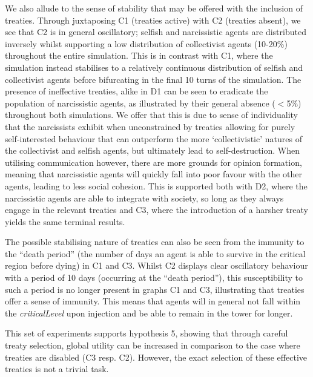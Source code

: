 We also allude to the sense of stability that may be offered with the inclusion of treaties. Through juxtaposing C1 (treaties active) with C2 (treaties absent), we see that C2 is in general oscillatory; selfish and narcissistic agents are distributed inversely whilst supporting a low distribution of collectivist agents (10-20\%) throughout the entire simulation. This is in contrast with C1, where the simulation instead stabilises to a relatively continuous distribution of selfish and collectivist agents before bifurcating in the final 10 turns of the simulation. The presence of ineffective treaties, alike in D1 can be seen to eradicate the population of narcissistic agents, as illustrated by their general absence ($<$5\%) throughout both simulations. We offer that this is due to sense of individuality that the narcissists exhibit when unconstrained by treaties allowing for purely self-interested behaviour that can outperform the more `collectivistic' natures of the collectivist and selfish agents, but ultimately lead to self-destruction. When utilising communication however, there are more grounds for opinion formation, meaning that narcissistic agents will quickly fall into poor favour with the other agents, leading to less social cohesion. This is supported both with D2, where the narcissistic agents are able to integrate with society, so long as they always engage in the relevant treaties and C3, where the introduction of a harsher treaty yields the same terminal results.

The possible stabilising nature of treaties can also be seen from the immunity to the ``death period'' (the number of days an agent is able to survive in the critical region before dying) in C1 and C3. Whilst C2 displays clear oscillatory behaviour with a period of 10 days (occurring at the ``death period''), this susceptibility to such a period is no longer present in graphs C1 and C3, illustrating that treaties offer a sense of immunity. This means that agents will in general not fall within the \textit{criticalLevel} upon injection and be able to remain in the tower for longer.

This set of experiments supports hypothesis 5, showing that through careful treaty selection, global utility can be increased in comparison to the case where treaties are disabled (C3 resp. C2). However, the exact selection of these effective treaties is not a trivial task.


